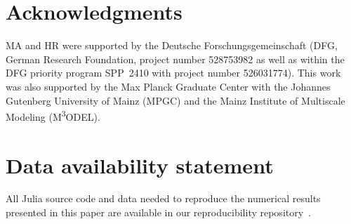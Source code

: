 \documentclass[]{scrartcl}
\theoremstyle{definition}
\begin{document}
\appendix
\section*{Acknowledgments}

MA and HR were supported by the Deutsche Forschungsgemeinschaft
(DFG, German Research Foundation, project number 528753982
as well as within the DFG priority program SPP~2410 with project number 526031774).
This work was also supported by the Max Planck Graduate Center with the
Johannes Gutenberg University of Mainz (MPGC) and
the Mainz Institute of Multiscale Modeling (M\textsuperscript{3}ODEL).


\section*{Data availability statement}

All Julia source code and data needed to reproduce the numerical results
presented in this paper are available in our reproducibility repository~\cite{artiano2026nonconservativeRepro}.

%
%
%
\printbibliography
\end{document}

